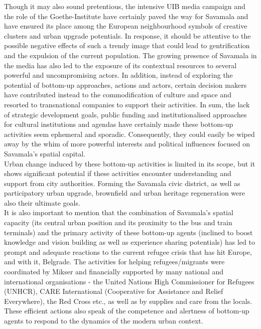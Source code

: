 \documentclass[11pt]{report}
\begin{document}
{{{Though it may also sound pretentious, the intensive UIB media campaign  and the role of the Goethe-Institute have certainly paved the way for Savamala and have ensured its place among the European neighbourhood symbols of creative clusters and urban upgrade potentials.
In response, it should be attentive to the possible negative effects of such a trendy image that could lead to gentrification and the expulsion of the current population.
The growing presence of Savamala in the media has also led to the exposure of its contextual resources to several powerful and uncompromising actors.
In addition, instead of exploring the potential of bottom-up approaches, actions and actors, certain decision makers have contributed instead to the commodification of culture and space and resorted to transnational companies  to support their activities.
In sum, the lack of strategic development goals, public funding and institutionalised approaches for cultural institutions and agendas have certainly made these bottom-up activities seem ephemeral and sporadic. Consequently, they could easily be wiped away by the whim of more powerful interests and political influences focused on Savamala’s spatial capital.
\\

Urban change induced by these bottom-up activities is limited in its scope, but it shows significant potential if these activities encounter understanding and support from city authorities.
Forming the Savamala civic district, as well as participatory urban upgrade, brownfield and urban heritage regeneration were also their ultimate goals.
\\

It is also important to mention that the combination of Savamala’s spatial capacity (its central urban position and its proximity to the bus and train terminals) and the primary activity of these bottom-up agents (inclined to boost knowledge and vision building as well as experience sharing potentials) has led to prompt and adequate reactions to the current refugee crisis that has hit Europe, and with it, Belgrade. The activities for helping refugees/migrants were coordinated by Mikser and financially supported by many national and international organisations - the United Nations High Commissioner for Refugees (UNHCR), CARE International (Cooperative for Assistance and Relief Everywhere), the Red Cross etc., as well as by supplies and care from the locals. These efficient actions also speak of the competence and alertness of bottom-up agents to respond to the dynamics of the modern urban context.
\\

}}}
\end{document}
